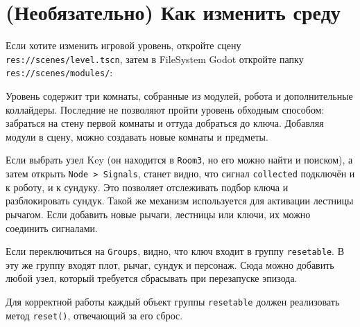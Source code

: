 \documentclass[11pt,a4paper]{article}
\begin{document}
\section{(Необязательно) Как изменить среду}\label{optional-how-to-customize-the-environment}

Если хотите изменить игровой уровень, откройте сцену \passthrough{\lstinline!res://scenes/level.tscn!}, затем в FileSystem Godot откройте папку \passthrough{\lstinline!res://scenes/modules/!}:


Уровень содержит три комнаты, собранные из модулей, робота и дополнительные коллайдеры. Последние не позволяют пройти уровень обходным способом: забраться на стену первой комнаты и оттуда добраться до ключа. Добавляя модули в сцену, можно создавать новые комнаты и предметы.

Если выбрать узел Key (он находится в \passthrough{\lstinline!Room3!}, но его можно найти и поиском), а затем открыть \passthrough{\lstinline!Node > Signals!}, станет видно, что сигнал \passthrough{\lstinline!collected!} подключён и к роботу, и к сундуку. Это позволяет отслеживать подбор ключа и разблокировать сундук. Такой же механизм используется для активации лестницы рычагом. Если добавить новые рычаги, лестницы или ключи, их можно соединить сигналами.


Если переключиться на \passthrough{\lstinline!Groups!}, видно, что ключ входит в группу \passthrough{\lstinline!resetable!}. В эту же группу входят плот, рычаг, сундук и персонаж. Сюда можно добавить любой узел, который требуется сбрасывать при перезапуске эпизода.


Для корректной работы каждый объект группы \passthrough{\lstinline!resetable!} должен реализовать метод \passthrough{\lstinline!reset()!}, отвечающий за его сброс.
\end{document}
